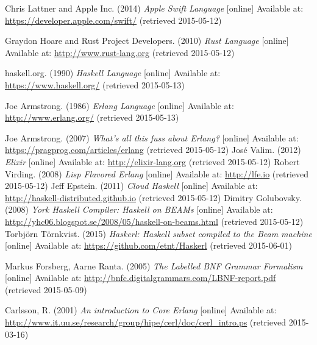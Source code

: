 \begin{thebibliography}{69}


 Chris Lattner and Apple Inc. (2014) \textit{Apple Swift Language} [online] Available at: \url{https://developer.apple.com/swift/} (retrieved 2015-05-12)

 Graydon Hoare and Rust Project Developers. (2010) \textit{Rust Language} [online] Available at: \url{http://www.rust-lang.org} (retrieved 2015-05-12)

 haskell.org. (1990) \textit{Haskell Language} [online] Available at: \url{https://www.haskell.org/} (retrieved 2015-05-13)

 Joe Armstrong. (1986) \textit{Erlang Language} [online] Available at: \url{http://www.erlang.org/} (retrieved 2015-05-13)

 Joe Armstrong. (2007) \textit{What's all this fuss about Erlang?} [online] Available at: \url{https://pragprog.com/articles/erlang} (retrieved 2015-05-12)
  José Valim. (2012) \textit{Elixir} [online] Available at: \url{http://elixir-lang.org} (retrieved 2015-05-12)
  Robert Virding. (2008) \textit{Lisp Flavored Erlang} [online] Available at: \url{http://lfe.io} (retrieved 2015-05-12)
  Jeff Epstein. (2011) \textit{Cloud Haskell} [online] Available at: \url{http://haskell-distributed.github.io} (retrieved 2015-05-12)
  Dimitry Golubovsky. (2008) \textit{York Haskell Compiler: Haskell on BEAMs} [online] Available at: \url{http://yhc06.blogspot.se/2008/05/haskell-on-beams.html} (retrieved 2015-05-12)
  Torbjörn Törnkvist. (2015) \textit{Haskerl: Haskell subset compiled to the Beam machine} [online] Available at: \url{https://github.com/etnt/Haskerl} (retrieved 2015-06-01)

 Markus Forsberg, Aarne Ranta. (2005) \textit{The Labelled BNF Grammar Formalism} [online] Available at: \url{http://bnfc.digitalgrammars.com/LBNF-report.pdf} (retrieved 2015-05-09)

 Carlsson, R. (2001) \textit{An introduction to Core Erlang} [online] Available at: \url{http://www.it.uu.se/research/group/hipe/cerl/doc/cerl_intro.ps} (retrieved 2015-03-16)



\end{thebibliography}

